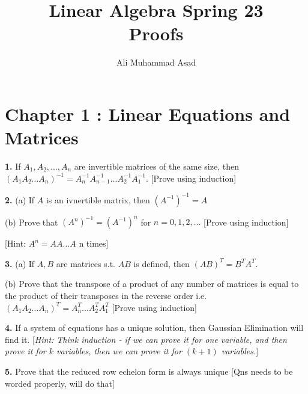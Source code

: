 \documentclass[addpoints]{exam}
\title{Linear Algebra Spring 23\\ Proofs}
\author{Ali Muhammad Asad}
\begin{document}
\maketitle
\begin{sloppypar}
\section*{\textbf{Chapter 1 : Linear Equations and Matrices}}
\begin{questions}
    \question
    \textbf{1. } If $ A_1, A_2,..., A_n $ are invertible matrices of the same size, then $ (A_1A_2...A_n)^{-1} = A_{n}^{-1}A_{n-1}^{-1}...A_{2}^{-1}A_{1}^{-1} $. [Prove using induction]
    \begin{solution}
        
    \end{solution}
    
    \question 
    \textbf{2. } (a) If $A$ is an ivnertible matrix, then $ (A^{-1})^{-1} = A $ 

    \hspace{5.5mm} (b) Prove that $ (A^n)^{-1} = (A^{-1})^n $ for $ n = 0, 1, 2, ... $ [Prove using induction] 
    
    [Hint: $ A^n = AA...A $ n times]
    \begin{solution}
        
    \end{solution}

    \question
    \textbf{3. } (a) If $ A, B $ are matrices s.t. $AB$ is defined, then $ (AB)^T = B^TA^T $. 

    (b) Prove that the transpose of a product of any number of matrices is equal to the product of their transposes in the reverse order i.e. $ (A_1A_2...A_n)^T = A_n^T...A_2^TA_1^T $ [Prove using induction]
    \begin{solution}
        
    \end{solution}

    \question
    \textbf{4. } If a system of equations has a unique solution, then Gaussian Elimination will find it. [\textit{Hint: Think induction - if we can prove it for one variable, and then prove it for $k$ variables, then we can prove it for $ (k+1) $ variables.}]
    \begin{solution}
        
    \end{solution}

    \question
    \textbf{5. } Prove that the reduced row echelon form is always unique [Qns needs to be worded properly, will do that]
    \begin{solution}
        
    \end{solution}
    
    

\end{questions}
\end{sloppypar}
\end{document}
